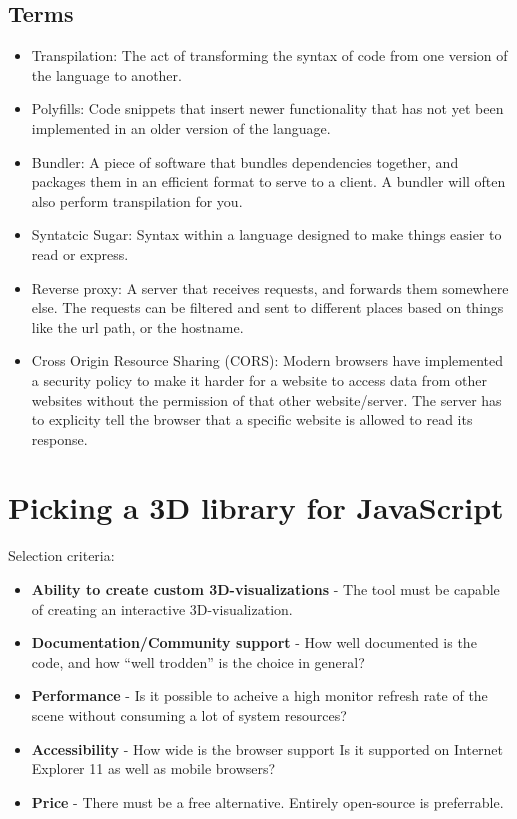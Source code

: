 \hypertarget{terms}{%
\subsection{Terms}\label{terms}}

\begin{itemize}
\item
  Transpilation: The act of transforming the syntax of code from one
  version of the language to another.
\item
  Polyfills: Code snippets that insert newer functionality that has not
  yet been implemented in an older version of the language.
\item
  Bundler: A piece of software that bundles dependencies together, and
  packages them in an efficient format to serve to a client. A bundler
  will often also perform transpilation for you.
\item
  Syntatcic Sugar: Syntax within a language designed to make things
  easier to read or express.
\item
  Reverse proxy: A server that receives requests, and forwards them
  somewhere else. The requests can be filtered and sent to different
  places based on things like the url path, or the hostname.
\item
  Cross Origin Resource Sharing (CORS): Modern browsers have implemented
  a security policy to make it harder for a website to access data from
  other websites without the permission of that other website/server.
  The server has to explicity tell the browser that a specific website
  is allowed to read its response.
\end{itemize}

\hypertarget{picking-a-3d-library-for-javascript}{%
\section{Picking a 3D library for
JavaScript}\label{picking-a-3d-library-for-javascript}}

Selection criteria:

\begin{itemize}
\tightlist
\item
  \textbf{Ability to create custom 3D-visualizations} - The tool must be
  capable of creating an interactive 3D-visualization.
\item
  \textbf{Documentation/Community support} - How well documented is the
  code, and how ``well trodden'' is the choice in general?
\item
  \textbf{Performance} - Is it possible to acheive a high monitor
  refresh rate of the scene without consuming a lot of system resources?
\item
  \textbf{Accessibility} - How wide is the browser support Is it
  supported on Internet Explorer 11 as well as mobile browsers?
\item
  \textbf{Price} - There must be a free alternative. Entirely
  open-source is preferrable.
\end{itemize}

